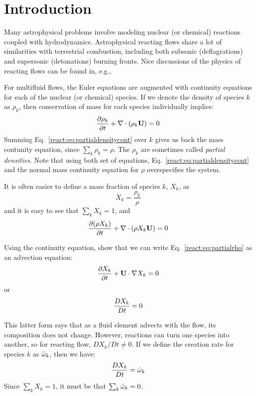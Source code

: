 
\section{Introduction}

Many astrophysical problems involve modeling nuclear (or chemical)
reactions coupled with hydrodynamics.  Astrophysical reacting flows
share a lot of similarities with terrestrial combustion, including
both subsonic (deflagrations) and supersonic (detonations) burning
fronts.  Nice discussions of the physics of reacting flows can be
found in, e.g., \cite{oranboris, peters:2000}


For multifluid flows, the Euler equations are
augmented with continuity equations for each of the nuclear (or chemical) species.  If we denote the density of species $k$ as
$\rho_k$, then conservation of mass for each species individually
implies:
\begin{equation}
\label{react:eq:partialdensitycont}
{\frac{{\partial\rho_k}}{\partial t}} + \nabla \cdot (\rho_k {\bf U}) = 0
\end{equation}
Summing Eq.~\ref{react:eq:partialdensitycont} over $k$ gives us back
the mass contunity equation, since $\sum_k \rho_k = \rho$.  The
$\rho_k$ are sometimes called {\em partial densities}.  Note that
using both set of equations, Eq.~\ref{react:eq:partialdensitycont} 
and the normal mass continuity equation for $\rho$ overspecifies 
the system.

It is often
easier to define a mass fraction of species $k$, $X_k$, as
\begin{equation}
X_k = \frac{\rho_k}{\rho}
\end{equation}
and it is easy to see that $\sum_k X_k = 1$, and 
\begin{equation}
\label{react:eq:partialrho}
\frac{\partial (\rho X_k)}{\partial t} + \nabla \cdot  (\rho X_k {\bf U}) = 0
\end{equation}

\begin{exercise}
Using the continuity equation, show that we can write
Eq.~\ref{react:eq:partialrho} as an advection equation:
\begin{equation}
\frac{\partial X_k}{\partial t} + {\bf U} \cdot \nabla X_k = 0
\end{equation}
or 
\begin{equation}
{\frac{{DX_k}}{D t}} = 0
\end{equation}
\end{exercise}

This latter form says that as a fluid element advects with the flow,
its composition does not change.  However, reactions can turn one
species into another, so for reacting flow, $DX_k/Dt \ne 0$.  If we
define the creation rate for species $k$ as ${\dot{\omega}}_k$, then we
have:
\begin{equation}
{\frac{{DX_k}}{D t}} = {\dot{\omega}}_k
\end{equation}
Since $\sum_k X_k = 1$, it must be that $\sum_k {\dot{\omega}}_k = 0$.


